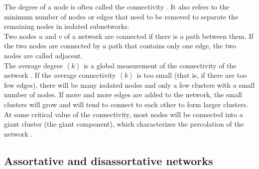 \documentclass[11 pt , letterpaper , twoside , openright]{book}
\begin{document}
The degree of a node is often called the connectivity \cite{F.Costa2007}\cite{Mendes2002}. It also refers to the minimum number of nodes or edges that need to be removed to separate the remaining nodes in isolated subnetworks.\\
\newline
Two nodes $u$ and $v$ of a network are connected if there is a path between them. If the two nodes are connected by a path that contains only one edge, the two nodes are called adjacent.\\
\newline
The average degree $\left<k\right>$ is a global measurement of the connectivity of the network \cite{Costa2008}. If the average connectivity $\left<k\right>$ is too small (that is, if there are too few edges), there will be many isolated nodes and only a few clusters with a small number of nodes. If more and more edges are added to the network, the small clusters will grow and will tend to connect to each other to form larger clusters. At some critical value of the connectivity, most nodes will be connected into a giant cluster (the giant component), which characterizes the percolation of the network \cite{F.Costa2007}.

\subsection{Assortative and disassortative networks}
\end{document}
